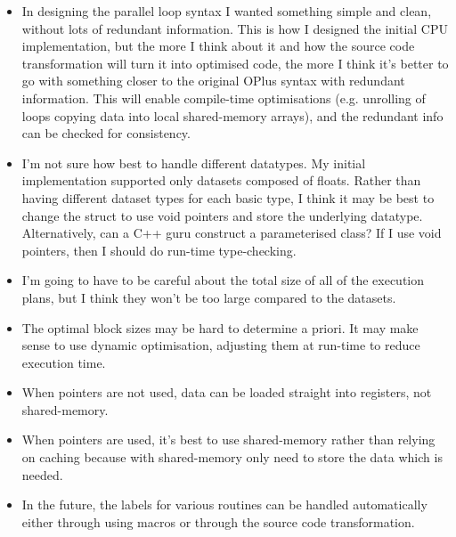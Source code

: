 \documentclass[12pt]{article}
\begin{document}
\begin{itemize}

\item
In designing the parallel loop syntax I wanted something simple and 
clean, without lots of redundant information.  This is how I designed
the initial CPU implementation, but the more I think about it and 
how the source code transformation will turn it into optimised code, 
the more I think it's better to go with something closer to the original
OPlus syntax with redundant information.  This will enable compile-time 
optimisations (e.g. unrolling of loops copying data into local 
shared-memory arrays), and the redundant info can be checked 
for consistency.

\item
I'm not sure how best to handle different datatypes.  My initial 
implementation supported only datasets composed of floats.  Rather than 
having different dataset types for each basic type, I think it may be 
best to change the struct to use void pointers and store the underlying 
datatype. Alternatively, can a C++ guru construct a parameterised class?
If I use void pointers, then I should do run-time type-checking.

\item
I'm going to have to be careful about the total size of all of the 
execution plans, but I think they won't be too large compared to the 
datasets.

\item
The optimal block sizes may be hard to determine a priori.  It may make
sense to use dynamic optimisation, adjusting them at run-time to reduce
execution time.

\item
When pointers are not used, data can be loaded straight into registers,
not shared-memory.

\item
When pointers are used, it's best to use shared-memory rather than relying 
on caching because with shared-memory only need to store the data which 
is needed.


\item
In the future, the labels for various routines can be handled automatically 
either through using macros or through the source code transformation.


\end{itemize}
\end{document}
